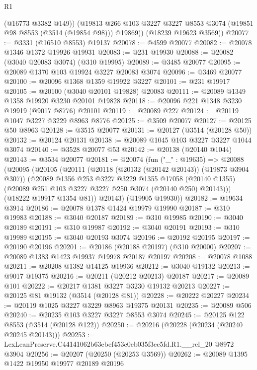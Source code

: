 \begin{lexlean}{R1}
\begin{coremodule}
          (@16773 @3382 @149))
        (@19813 @266 @103 @3227 @3227 @8553 @3074 (@19851 @98 @8553 (@3514 (@19854 @98))) @19869))
      (@18239 @19623 @3569))
@20077 := @3331 (@16510 @8553) @19137
@20078 := @4599 @20077
@20082 := @20078 @1346 @1372 @19926 @19931
@20083 := @231 @19930
@20088 := @20082 (@3040 @20083 @3074) (@310 @19995)
@20089 := @3485 @20077
@20095 := @20089 @1370 @103 @19924 @3227 @20083 @3074
@20096 := @3469 @20077
@20100 := @20096 @1368 @1359 @19922 @3227
@20101 := @231 @19917
@20105 := @20100 (@3040 @20101 @19828) @20083
@20111 := @20089 @1349 @1358 @19920 @3230 @20101 @19828
@20118 := @20096 @221 @1348 @3230 @19919 (@9017 @8776) @20101
@20119 := @20089 @227
@20124 := @20119 @1047 @3227 @3229 @8963 @8776
@20125 := @3509 @20077
@20127 := @20125 @50 @8963
@20128 := @3515 @20077
@20131 := @20127 (@3514 (@20128 @50))
@20132 := @20124 @20131
@20138 := @20089 @1045 @103 @3227 @3227 @1044 @3074
@20140 := @3528 @20077 @53
@20142 := @20138 (@20140 @1044)
@20143 := @3534 @20077
@20181 := @20074
    (fun ("_" : @19635) =>
    @20088
      (@20095
        (@20105
          (@20111
            (@20118 (@20132 (@20142 @20143)) (@19873 @3904 @307))
            (@20089
              @1356
              @253
              @3227
              @3229
              @1355
              @17058
              (@20140 @1355)
              (@20089 @251 @103 @3227 @3227 @250 @3074 (@20140 @250) @20143)))
          (@18222 @19917 @1354 @81))
        @20143)
      (@19905 @19930))
@20182 := @19634 @3914
@20186 := @20078 @1378 @1424 @19979 @19990
@20187 := @310 @19983
@20188 := @3040 @20187
@20189 := @310 @19985
@20190 := @3040 @20189
@20191 := @310 @19987
@20192 := @3040 @20191
@20193 := @310 @19989
@20195 := @3040 @20193 @3074
@20196 := @20192 @20195
@20197 := @20190 @20196
@20201 := @20186 (@20188 @20197) (@310 @20000)
@20207 := @20089 @1383 @1423 @19937 @19978 @20187 @20197
@20208 := @20078 @1088
@20211 := @20208 @1382 @14125 @19936
@20212 := @3040 @19132
@20213 := @9017 @19375
@20216 := @20211 (@20212 @20213) @20187
@20217 := @20089 @101
@20222 := @20217 @1381 @3227 @3230 @19132 @20213
@20227 := @20125 @81 @19132 (@3514 (@20128 @81))
@20228 := @20222 @20227
@20234 := @20119 @1025 @3227 @3229 @8963 @19375 @20131
@20235 := @20089 @506
@20240 := @20235 @103 @3227 @3227 @8553 @3074
@20245 := @20125 @122 @8553 (@3514 (@20128 @122))
@20250 := @20216 (@20228 (@20234 (@20240 @20245 @20143)))
@20253 := LexLeanPreserve.C44141062b63ebef453c0eb035f3ec5fd.R1.__rel_20 @8972 @3904
@20256 := @20207 (@20250 (@20253 @3569))
@20262 := @20089 @1395 @1422 @19950 @19977 @20189 @20196

\end{coremodule}
\end{lexlean}
